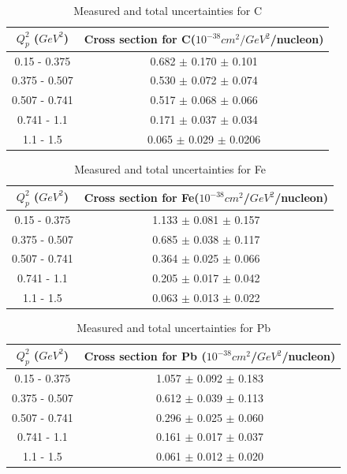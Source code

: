\begin{table}[ht]
\begin{center}
    \begin{tabular}{c| c}
    \hline
\hline 
    $Q^{2}_{p}$ ($GeV^2$) & Cross section for C($10^{-38}cm^2/GeV^2$/nucleon) \\  
\hline
    0.15 - 0.375 & 0.682 $\pm$ 0.170 $\pm$ 0.101 \\  
    0.375 - 0.507 & 0.530 $\pm$ 0.072 $\pm$ 0.074\\  
    0.507 - 0.741 & 0.517 $\pm$ 0.068 $\pm$ 0.066\\  
    0.741 - 1.1 & 0.171 $\pm$ 0.037 $\pm$ 0.034\\  
    1.1 - 1.5 & 0.065 $\pm$ 0.029 $\pm$ 0.0206\\  
     \hline
\hline
    \end{tabular}
\caption{Measured \xsecproton and total uncertainties for C }

\end{center}
\end{table}

\begin{table}[ht]
\begin{center}
    \begin{tabular}{c|c}
     \hline
\hline
    $Q^{2}_{p}$ ($GeV^2$) & Cross section for Fe($10^{-38}$$cm^2$/$GeV^2$/nucleon) \\  
\hline
    0.15 - 0.375 & 1.133 $\pm$ 0.081 $\pm$ 0.157 \\  
    0.375 - 0.507 & 0.685 $\pm$ 0.038 $\pm$ 0.117\\  
    0.507 - 0.741 & 0.364 $\pm$ 0.025 $\pm$ 0.066\\  
    0.741 - 1.1 & 0.205 $\pm$ 0.017 $\pm$ 0.042\\  
    1.1 - 1.5 & 0.063 $\pm$ 0.013 $\pm$ 0.022\\  
     \hline
\hline
    \end{tabular}
\caption{Measured \xsecproton and total uncertainties for Fe }
\end{center}
\end{table}

\begin{table}[ht]
\begin{center}
    \begin{tabular}{c|c}
     \hline
\hline
    $Q^{2}_{p}$ ($GeV^2$) & Cross section for Pb ($10^{-38}$$cm^2$/$GeV^2$/nucleon) \\  
\hline
    0.15 - 0.375 & 1.057 $\pm$ 0.092 $\pm$ 0.183 \\  
    0.375 - 0.507 & 0.612 $\pm$ 0.039 $\pm$ 0.113\\  
    0.507 - 0.741 & 0.296 $\pm$ 0.025 $\pm$ 0.060\\  
    0.741 - 1.1 & 0.161 $\pm$ 0.017 $\pm$ 0.037\\  
    1.1 - 1.5 & 0.061 $\pm$ 0.012 $\pm$ 0.020\\  
     \hline
\hline
    \end{tabular}
\caption{Measured \xsecproton and total uncertainties for Pb }
\end{center}
\end{table}

